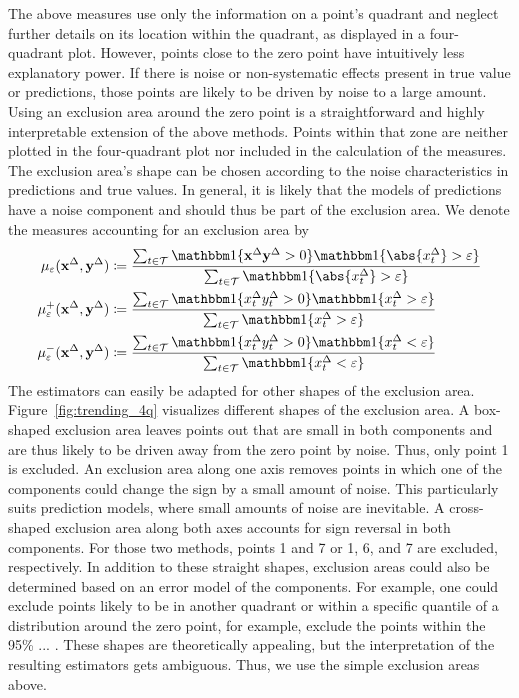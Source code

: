 The above measures use only the information on a point's quadrant and neglect further details on its location within the quadrant, as displayed in a four-quadrant plot.
However, points close to the zero point have intuitively less explanatory power.
If there is noise or non-systematic effects present in true value or predictions, those points are likely to be driven by noise to a large amount. 
Using an exclusion area around the zero point is a straightforward and highly interpretable extension of the above methods.
Points within that zone are neither plotted in the four-quadrant plot nor included in the calculation of the measures.
The exclusion area's shape can be chosen according to the noise characteristics in predictions and true values.
In general, it is likely that the models of predictions have a noise component and should thus be part of the exclusion area.
We denote the measures accounting for an exclusion area by
\begin{align}
    \acceps (\diffx, \diffy) &\coloneqq \frac{\sum_{t \in \mathcal{T}} \ind{\diffx \diffy > 0} \ind{\abs{\diffxt} > \varepsilon}}{\sum_{t \in \mathcal{T}} \ind{\abs{\diffxt} > \varepsilon}}\label{eq:acceps}\\
    \accpeps (\diffx, \diffy) &\coloneqq \frac{\sum_{t \in \mathcal{T}} \ind{\diffxt \diffyt > 0} \ind{\diffxt > \varepsilon}}{\sum_{t \in \mathcal{T}} \ind{\diffxt > \varepsilon}} \label{eq:accpeps}\\
    \accmeps (\diffx, \diffy) &\coloneqq \frac{\sum_{t \in \mathcal{T}} \ind{\diffxt \diffyt > 0} \ind{\diffxt < \varepsilon}}{\sum_{t \in \mathcal{T}} \ind{\diffxt < \varepsilon }}\label{eq:accmeps}
\end{align}
The estimators can easily be adapted for other shapes of the exclusion area.
Figure~\ref{fig:trending_4q} visualizes different shapes of the exclusion area.
A box-shaped exclusion area leaves points out that are small in both components and are thus likely to be driven away from the zero point by noise.
Thus, only point 1 is excluded.
An exclusion area along one axis removes points in which one of the components could change the sign by a small amount of noise.
This particularly suits prediction models, where small amounts of noise are inevitable.
A cross-shaped exclusion area along both axes accounts for sign reversal in both components.
For those two methods, points 1 and 7 or 1, 6, and 7 are excluded, respectively.
In addition to these straight shapes, exclusion areas could also be determined based on an error model of the components.
For example, one could exclude points likely to be in another quadrant or within a specific quantile of a distribution around the zero point, for example, exclude the points within the 95\% ... . 
These shapes are theoretically appealing, but the interpretation of the resulting estimators gets ambiguous.
Thus, we use the simple exclusion areas above.

